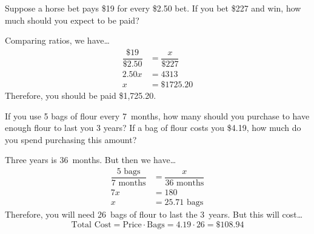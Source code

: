 \documentclass[11pt,letterpaper]{article}
\begin{document}
\newpage



 Suppose a horse bet pays \$19 for every \$2.50 bet. If you bet \$227 and win, how much should you expect to be paid? \pspace

\sol Comparing ratios, we have\dots \pspace
	\[
	\begin{aligned}
	\dfrac{\$19}{\$2.50}&= \dfrac{x}{\$227} \\[0.3cm]
	2.50x&= 4313 \\[0.3cm]
	x&= \$1725.20
	\end{aligned}
	\] \pspace
Therefore, you should be paid \$1,725.20.



\newpage



 If you use 5 bags of flour every 7~months, how many should you purchase to have enough flour to last you 3 years? If a bag of flour costs you \$4.19, how much do you spend purchasing this amount? \pspace

\sol Three years is 36~months. But then we have\dots \pspace
	\[
	\begin{aligned}
	\dfrac{5 \text{ bags}}{7 \text{ months}}&= \dfrac{x}{36 \text{ months}} \\[0.3cm]
	7x&= 180 \\[0.3cm]
	x&= 25.71 \text{ bags}
	\end{aligned}
	\] \pspace
Therefore, you will need 26~bags of flour to last the 3~years. But this will cost\dots \pspace
	\[
	\text{Total Cost}= \text{Price} \cdot \text{Bags}=  4.19 \cdot 26= \$108.94
	\]
\end{document}
